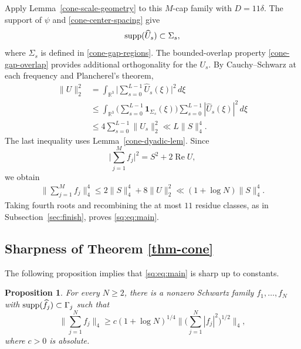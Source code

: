 \documentclass{amsart}
\numberwithin{equation}{section}
\newtheorem{proposition}[theorem]{Proposition}
\newcommand{\wh}{\widehat}
\newcommand{\ZR}{\mathbb{R}}
\newcommand{\supp}{{\rm supp}}
\begin{document}
Apply Lemma~\ref{cone-scale-geometry} to this $M$-cap family  with $D=11\delta$.
The support of $\psi$ and \eqref{cone-center-spacing} give
\[
    \supp(\wh U_s)\subset\Sigma_s,
\]
where $\Sigma_s$ is defined in \eqref{cone-gap-regions}.
The bounded-overlap property \eqref{cone-gap-overlap} provides additional orthogonality for the $U_s$.
By Cauchy--Schwarz at each frequency and Plancherel's theorem,
\begin{align*}
    \|U\|_2^2
    &=\int_{\ZR^3}\Big|\sum_{s=0}^{L-1}\wh U_s(\xi)\Big|^2\,d\xi\\
    &\leq\int_{\ZR^3}
      \Big(\sum_{s=0}^{L-1}\mathbf{1}_{\Sigma_s}(\xi)\Big)
      \sum_{s=0}^{L-1}|\wh U_s(\xi)|^2\,d\xi\\
    &\leq4\sum_{s=0}^{L-1}\|U_s\|_2^2
      \ll L\|S\|_4^4.
\end{align*}
The last inequality uses Lemma~\ref{cone-dyadic-lem}. Since
\[
    \Big|\sum_{j=1}^M f_j\Big|^2=S^2+2\operatorname{Re}U,
\]
we obtain
\begin{equation}
\nonumber
\begin{aligned}
    \Big\|\sum_{j=1}^M f_j\Big\|_4^4 \leq2\|S\|_4^4+8\|U\|_2^2\ll(1+\log N)\|S\|_4^4.
\end{aligned}
\end{equation}
Taking fourth roots and recombining the at most $11$ residue classes, as in Subsection~\ref{sec:finish}, proves \eqref{sq:eq:main}. 

\medskip 

\subsection{Sharpness of Theorem \ref{thm-cone}}
\label{sec:cone-sharpness}
The following proposition implies that \eqref{sq:eq:main} is sharp up to constants.

\begin{samepage}
\begin{proposition}
\label{cone-sharpness-prop}
For every $N\geq2$, there is a nonzero Schwartz family
$f_1,\ldots,f_N$ with $\supp(\wh f_j)\subset\Gamma_j$ such that
\begin{equation}
\label{cone-sharpness-conclusion}
    \Big\|\sum_{j=1}^Nf_j\Big\|_4
    \geq c(1+\log N)^{1/4}
    \Big\|\Big(\sum_{j=1}^N|f_j|^2\Big)^{1/2}\Big\|_4,
\end{equation}
where $c>0$ is absolute.
\end{proposition}
\end{samepage}
\end{document}
